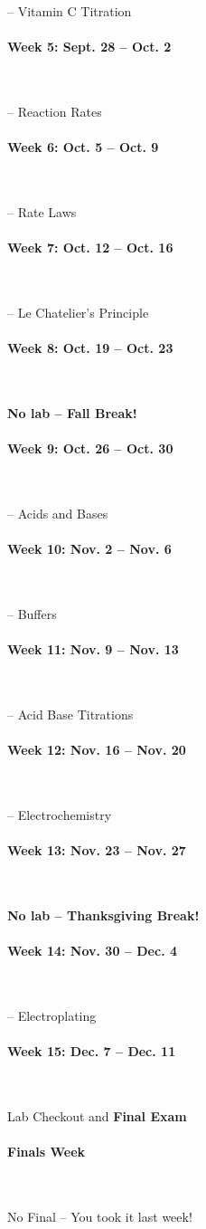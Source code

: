 \documentclass[12pt, letterpaper]{article}
\begin{document}
-- Vitamin C Titration

\paragraph{Week 5: Sept. 28 -- Oct. 2}~

-- Reaction Rates

\paragraph{Week 6: Oct. 5 -- Oct. 9}~

-- Rate Laws

\paragraph{Week 7: Oct. 12 -- Oct. 16}~

-- Le Chatelier's Principle

\paragraph{Week 8: Oct. 19 -- Oct. 23}~

\textbf{No lab -- Fall Break!}

\paragraph{Week 9: Oct. 26 -- Oct. 30}~

-- Acids and Bases

\paragraph{Week 10: Nov. 2 -- Nov. 6}~

-- Buffers

\paragraph{Week 11: Nov. 9 -- Nov. 13}~

-- Acid Base Titrations

\paragraph{Week 12: Nov. 16 -- Nov. 20}~

-- Electrochemistry

\paragraph{Week 13: Nov. 23 -- Nov. 27}~

\textbf{No lab -- Thanksgiving Break!}

\paragraph{Week 14: Nov. 30 -- Dec. 4}~

-- Electroplating

\paragraph{Week 15: Dec. 7 -- Dec. 11}~

Lab Checkout and \textbf{Final Exam}

\paragraph{Finals Week}~

No Final -- You took it last week!
\end{document}
